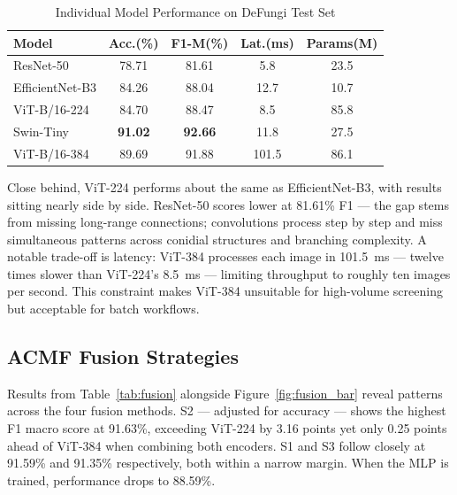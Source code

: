 \documentclass[conference]{IEEEtran}
\begin{document}
\begin{table}[!t]
  \caption{Individual Model Performance on DeFungi Test Set}
  \label{tab:baselines}
  \centering
  \footnotesize\setlength{\tabcolsep}{4pt}
  \begin{tabular}{lcccc}
    \toprule
    \textbf{Model} & \textbf{Acc.(\%)} & \textbf{F1-M(\%)} & \textbf{Lat.(ms)} & \textbf{Params(M)}\\
    \midrule
    ResNet-50         & 78.71 & 81.61 &   5.8 & 23.5 \\
    EfficientNet-B3   & 84.26 & 88.04 &  12.7 & 10.7 \\
    ViT-B/16-224      & 84.70 & 88.47 &   8.5 & 85.8 \\
    Swin-Tiny         & \textbf{91.02} & \textbf{92.66} & 11.8 & 27.5 \\
    ViT-B/16-384      & 89.69 & 91.88 & 101.5 & 86.1 \\
    \bottomrule
  \end{tabular}
\end{table}

Close behind, ViT-224 performs about the same as EfficientNet-B3, with results
sitting nearly side by side. ResNet-50 scores lower at 81.61\% F1 --- the gap
stems from missing long-range connections; convolutions process step by step
and miss simultaneous patterns across conidial structures and branching
complexity. A notable trade-off is latency: ViT-384 processes each image in
101.5~ms --- twelve times slower than ViT-224's 8.5~ms --- limiting throughput
to roughly ten images per second. This constraint makes ViT-384 unsuitable for
high-volume screening but acceptable for batch workflows.

\subsection{ACMF Fusion Strategies}

Results from Table~\ref{tab:fusion} alongside Figure~\ref{fig:fusion_bar}
reveal patterns across the four fusion methods. S2 --- adjusted for accuracy
--- shows the highest F1 macro score at 91.63\%, exceeding ViT-224 by 3.16
points yet only 0.25 points ahead of ViT-384 when combining both encoders.
S1 and S3 follow closely at 91.59\% and 91.35\% respectively, both within a
narrow margin. When the MLP is trained, performance drops to 88.59\%.
\end{document}

